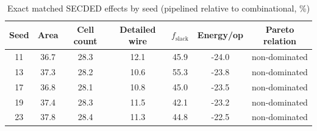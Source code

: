 \begin{table}[t]
\caption{Exact matched SECDED effects by seed (pipelined relative to combinational, \%)}
\label{tab:paired-seeds}
\centering
\scriptsize
\setlength{\tabcolsep}{6.0pt}
\begin{tabular}{@{}ccccccc@{}}
\toprule
Seed & Area & Cell count & Detailed wire & $f_{\mathrm{slack}}$ & Energy/op & Pareto relation \\
\midrule
11 & 36.7 & 28.3 & 12.1 & 45.9 & -24.0 & non-dominated \\
13 & 37.3 & 28.2 & 10.6 & 55.3 & -23.8 & non-dominated \\
17 & 36.8 & 28.1 & 10.8 & 45.0 & -23.5 & non-dominated \\
19 & 37.4 & 28.3 & 11.5 & 42.1 & -23.2 & non-dominated \\
23 & 37.8 & 28.4 & 11.3 & 44.8 & -22.5 & non-dominated \\
\bottomrule
\end{tabular}
\end{table}
